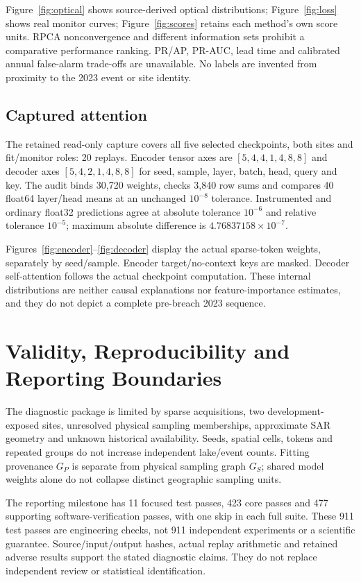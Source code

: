 \documentclass[10pt,twocolumn]{article}
\begin{document}
Figure~\ref{fig:optical} shows source-derived optical distributions; Figure~\ref{fig:loss} shows real monitor curves; Figure~\ref{fig:scores} retains each method's own score units. RPCA nonconvergence and different information sets prohibit a comparative performance ranking. PR/AP, PR-AUC, lead time and calibrated annual false-alarm trade-offs are unavailable. No labels are invented from proximity to the 2023 event or site identity.

\subsection{Captured attention}
The retained read-only capture covers all five selected checkpoints, both sites and fit/monitor roles: 20 replays. Encoder tensor axes are $[5,4,4,1,4,8,8]$ and decoder axes $[5,4,2,1,4,8,8]$ for seed, sample, layer, batch, head, query and key. The audit binds 30,720 weights, checks 3,840 row sums and compares 40 float64 layer/head means at an unchanged $10^{-8}$ tolerance. Instrumented and ordinary float32 predictions agree at absolute tolerance $10^{-6}$ and relative tolerance $10^{-5}$; maximum absolute difference is $4.76837158\times10^{-7}$.

Figures~\ref{fig:encoder}--\ref{fig:decoder} display the actual sparse-token weights, separately by seed/sample. Encoder target/no-context keys are masked. Decoder self-attention follows the actual checkpoint computation. These internal distributions are neither causal explanations nor feature-importance estimates, and they do not depict a complete pre-breach 2023 sequence.

\section{Validity, Reproducibility and Reporting Boundaries}
The diagnostic package is limited by sparse acquisitions, two development-exposed sites, unresolved physical sampling memberships, approximate SAR geometry and unknown historical availability. Seeds, spatial cells, tokens and repeated groups do not increase independent lake/event counts. Fitting provenance $G_P$ is separate from physical sampling graph $G_S$; shared model weights alone do not collapse distinct geographic sampling units.

The reporting milestone has 11 focused test passes, 423 core passes and 477 supporting software-verification passes, with one skip in each full suite. These 911 test passes are engineering checks, not 911 independent experiments or a scientific guarantee. Source/input/output hashes, actual replay arithmetic and retained adverse results support the stated diagnostic claims. They do not replace independent review or statistical identification.
\end{document}
